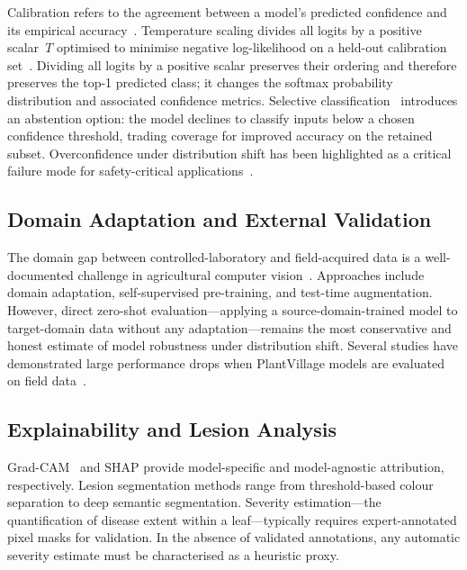 \documentclass[conference]{IEEEtran}
\begin{document}
Calibration refers to the agreement between a model's predicted
confidence and its empirical
accuracy~\cite{guo2017calibration}. Temperature scaling divides all
logits by a positive scalar~$T$ optimised to minimise negative
log-likelihood on a held-out calibration
set~\cite{guo2017calibration,platt1999probabilistic}. Dividing all
logits by a positive scalar preserves their ordering and therefore
preserves the top-1 predicted class; it changes the softmax
probability distribution and associated confidence metrics. Selective
classification~\cite{geifman2017selective}
introduces an abstention option: the model declines to classify inputs
below a chosen confidence threshold, trading coverage for improved
accuracy on the retained subset. Overconfidence under distribution
shift has been highlighted as a critical failure mode for
safety-critical
applications~\cite{ovadia2019can}.

\subsection{Domain Adaptation and External Validation}

The domain gap between controlled-laboratory and field-acquired data
is a well-documented challenge in agricultural computer
vision~\cite{barbedo2018factors}. Approaches
include domain
adaptation,
self-supervised pre-training,
and test-time augmentation. However, direct zero-shot
evaluation---applying a source-domain-trained model to target-domain
data without any adaptation---remains the most conservative and honest
estimate of model robustness under distribution
shift. Several studies have demonstrated
large performance drops when PlantVillage models are evaluated on
field
data~\cite{singh2020plantdoc,fuentes2017robust}.

\subsection{Explainability and Lesion Analysis}

Grad-CAM~\cite{selvaraju2017gradcam} and
SHAP provide model-specific and model-agnostic
attribution, respectively. Lesion segmentation methods range from
threshold-based colour
separation to deep semantic
segmentation. Severity estimation---the
quantification of disease extent within a leaf---typically requires
expert-annotated pixel masks for
validation. In the absence of
validated annotations, any automatic severity estimate must be
characterised as a heuristic proxy.
\end{document}

